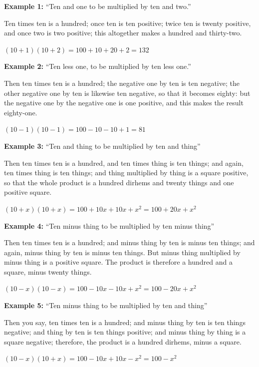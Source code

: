 \documentclass[11pt,a4paper]{book}
\begin{document}
\begin{minipage}[t]{0.48\textwidth}
\raggedright

\textbf{Example 1:} ``Ten and one to be multiplied by ten and two.''

Ten times ten is a hundred; once ten is ten positive; twice ten is twenty positive, and once two is two positive; this altogether makes a hundred and thirty-two.

$(10 + 1)(10 + 2) = 100 + 10 + 20 + 2 = 132$

\vspace{0.3cm}

\textbf{Example 2:} ``Ten less one, to be multiplied by ten less one.''

Then ten times ten is a hundred; the negative one by ten is ten negative; the other negative one by ten is likewise ten negative, so that it becomes eighty: but the negative one by the negative one is one positive, and this makes the result eighty-one.

$(10 - 1)(10 - 1) = 100 - 10 - 10 + 1 = 81$

\vspace{0.3cm}

\textbf{Example 3:} ``Ten and thing to be multiplied by ten and thing''

Then ten times ten is a hundred, and ten times thing is ten things; and again, ten times thing is ten things; and thing multiplied by thing is a square positive, so that the whole product is a hundred dirhems and twenty things and one positive square.

$(10 + x)(10 + x) = 100 + 10x + 10x + x^2 = 100 + 20x + x^2$

\vspace{0.3cm}

\textbf{Example 4:} ``Ten minus thing to be multiplied by ten minus thing''

Then ten times ten is a hundred; and minus thing by ten is minus ten things; and again, minus thing by ten is minus ten things. But minus thing multiplied by minus thing is a positive square. The product is therefore a hundred and a square, minus twenty things.

$(10 - x)(10 - x) = 100 - 10x - 10x + x^2 = 100 - 20x + x^2$

\vspace{0.3cm}

\textbf{Example 5:} ``Ten minus thing to be multiplied by ten and thing''

Then you say, ten times ten is a hundred; and minus thing by ten is ten things negative; and thing by ten is ten things positive; and minus thing by thing is a square negative; therefore, the product is a hundred dirhems, minus a square.

$(10 - x)(10 + x) = 100 - 10x + 10x - x^2 = 100 - x^2$

\end{minipage}
\vspace{0.3cm}
\end{document}
